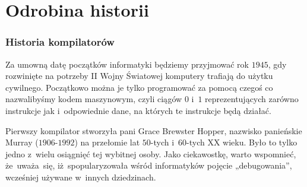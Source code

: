 \documentclass[10pt,t]{beamer}
\begin{document}
\section{Odrobina historii}


\begin{frame}
  \frametitle{Historia kompilatorów}


  Za umowną datę początków informatyki będziemy przyjmować rok $1945$,
  gdy rozwinięte na potrzeby II Wojny Światowej komputery trafiają do
  użytku cywilnego. Początkowo można je tylko programować za pomocą czegoś
  co nazwalibyśmy kodem maszynowym, czyli ciągów $0$ i~$1$ reprezentujących
  zarówno instrukcje jak i~odpowiednie dane, na których te instrukcje będą
  działać.

  Pierwszy kompilator stworzyła pani Grace Brewster Hopper, nazwisko
  panieńskie Murray ($1906\text{-}1992$) na przełomie lat $50$-tych
  i~$60$-tych XX wieku. Było to tylko jedno z~wielu osiągnięć tej wybitnej
  osoby. Jako ciekawostkę, warto wspomnieć, że~uważa~się,
  iż~spopularyzowała wśród informatyków pojęcie „debugowania”, wcześniej
  używane w~innych dziedzinach.

\end{frame}
\end{document}
